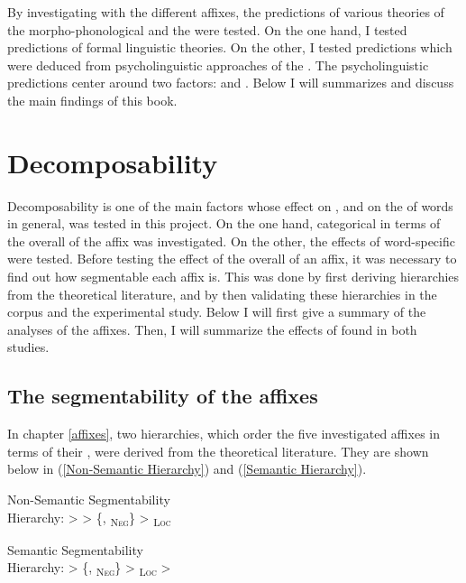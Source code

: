 By investigating  with the different affixes, the predictions of various theories of the morpho-phonological and the  were tested. On the one hand, I tested predictions of formal linguistic theories. On the other, I tested predictions which were deduced from psycholinguistic approaches of the . The psycholinguistic predictions center around two factors:  and .  Below I will summarizes and discuss the main findings of this book.



\section{Decomposability}

Decomposability is one of the main factors whose effect on , and on the  of words in general, was tested in this project. On the one hand, categorical  in terms of the overall  of the affix was investigated. On the other, the effects of word-specific  were tested. 
Before testing the effect of the overall  of an affix, it was necessary to find out how segmentable each affix is. This was done by first deriving  hierarchies from the theoretical literature, and by then validating these hierarchies  in the corpus and the experimental study. Below I will first give a summary of the  analyses of the affixes. Then, I will summarize the effects of  found in both studies.



\subsection{The segmentability of the affixes}

In chapter \ref{affixes}, two  hierarchies, which order the five investigated affixes in terms of their , were derived from the theoretical literature. They are shown below in (\ref{Non-Semantic Hierarchy})  and (\ref{Semantic Hierarchy}). 


	\begin{exe}
		\ex \label{Non-Semantic Hierarchy} {Non-Semantic Segmentability }\\
		Hierarchy:\hspace*{3.5cm}   >  > \{, \textsubscript{\textsc{Neg}}\} >  \textsubscript{\textsc{Loc}}
		
				\ex \label{Semantic Hierarchy} 	{Semantic Segmentability }\\
				Hierarchy: \hspace*{3.5cm}  > \{, \textsubscript{\textsc{Neg}}\} >  \textsubscript{\textsc{Loc}} > 
	\end{exe}

